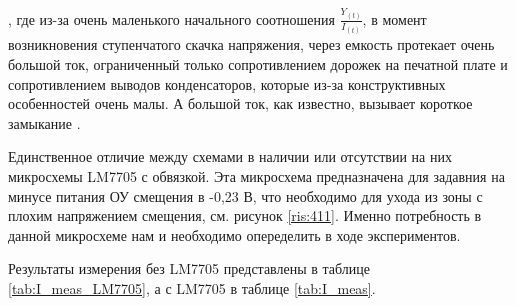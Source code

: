 , где из-за очень маленького начального соотношения $\frac{Y_{(t)}}{I_{(t)}}$, в момент возникновения ступенчатого
скачка напряжения, через емкость протекает очень большой ток, ограниченный только сопротивлением
дорожек на печатной плате и сопротивлением выводов конденсаторов, которые из-за конструктивных особенностей очень
малы. А большой ток, как известно, вызывает короткое замыкание \cite{Howard J: Start Black Magic}.

Единственное отличие между схемами в наличии или отсутствии на них микросхемы LM7705 с обвязкой. Эта микросхема
предназначена для задавния на минусе питания ОУ смещения в -0,23 В, что необходимо для ухода из зоны с плохим 
напряжением смещения, см. рисунок \ref{ris:411}. Именно потребность в данной микросхеме нам и необходимо опеределить
в ходе экспериментов.

Результаты измерения без LM7705 представлены в таблице \ref{tab:I_meas_LM7705}, а с LM7705 в таблице \ref{tab:I_meas}.


